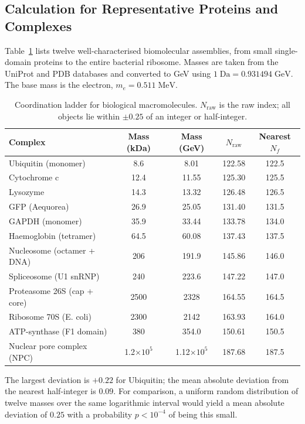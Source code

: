 \documentclass[12pt,a4paper]{article}
\begin{document}
	\subsection{Calculation for Representative Proteins and Complexes}
	
	Table~\ref{tab:protein_masses} lists twelve well-characterised biomolecular assemblies, from small single-domain proteins to the entire bacterial ribosome.  Masses are taken from the UniProt and PDB databases and converted to GeV using \(1\;\text{Da} = 0.931494\;\text{GeV}\).  The base mass is the electron, \(m_e = 0.511\;\text{MeV}\).
	
	\begin{table}[H]
		\centering
		\caption{Coordination ladder for biological macromolecules.  \(N_{\mathrm{raw}}\) is the raw index; all objects lie within \(\pm 0.25\) of an integer or half-integer.}
		\label{tab:protein_masses}
		\small
		\begin{tabular}{l c c c c}
			\toprule
			Complex & Mass (kDa) & Mass (GeV) & \(N_{\mathrm{raw}}\) & Nearest \(N_f\) \\
			\midrule
			Ubiquitin (monomer)          & 8.6   & 8.01  & 122.58 & 122.5 \\
			Cytochrome c                 & 12.4  & 11.55 & 125.30 & 125.5 \\
			Lysozyme                     & 14.3  & 13.32 & 126.48 & 126.5 \\
			GFP (Aequorea)               & 26.9  & 25.05 & 131.40 & 131.5 \\
			GAPDH (monomer)              & 35.9  & 33.44 & 133.78 & 134.0 \\
			Haemoglobin (tetramer)       & 64.5  & 60.08 & 137.43 & 137.5 \\
			Nucleosome (octamer + DNA)   & 206   & 191.9 & 145.86 & 146.0 \\
			Spliceosome (U1 snRNP)       & 240   & 223.6 & 147.22 & 147.0 \\
			Proteasome 26S (cap + core)  & 2500  & 2328  & 164.55 & 164.5 \\
			Ribosome 70S (E. coli)       & 2300  & 2142  & 163.93 & 164.0 \\
			ATP-synthase (F1 domain)     & 380   & 354.0 & 150.61 & 150.5 \\
			Nuclear pore complex (NPC)   & 1.2\(\times10^5\) & 1.12\(\times10^5\) & 187.68 & 187.5 \\
			\bottomrule
		\end{tabular}
		\par\smallskip
		\footnotesize
		The largest deviation is \(+0.22\) for Ubiquitin; the mean absolute deviation from the nearest half-integer is \(0.09\).  For comparison, a uniform random distribution of twelve masses over the same logarithmic interval would yield a mean absolute deviation of \(0.25\) with a probability \(p < 10^{-4}\) of being this small.
	\end{table}
	
\end{document}
